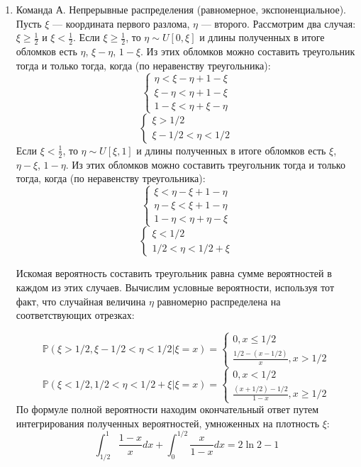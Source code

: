 \documentclass[a4paper,12pt]{article}
\def \P{\mathbb{P}}
\begin{document}
\begin{enumerate}
\item Команда А. Непрерывные распределения (равномерное, экспоненциальное).
Пусть $\xi$ — координата первого разлома, $\eta$ — второго. Рассмотрим два случая: $\xi\geq\frac{1}{2}$ и $\xi<\frac{1}{2}$.
Если $\xi\geq\frac{1}{2}$, то $\eta \sim U[0,\xi]$ и длины полученных в итоге обломков есть $\eta$, $\xi-\eta$, $1-\xi$. Из этих обломков можно составить треугольник тогда и только тогда, когда (по неравенству треугольника):
\[\begin{cases} \eta < \xi-\eta+1-\xi\\
\xi-\eta<\eta+1-\xi\\
1-\xi<\eta+\xi-\eta
\end{cases}
\]
\[\begin{cases} \xi>1/2\\
\xi-1/2<\eta<1/2
\end{cases}
\]
Если $\xi<\frac{1}{2}$, то $\eta \sim U[\xi,1]$ и длины полученных в итоге обломков есть $\xi$, $\eta-\xi$, $1-\eta$. Из этих обломков можно составить треугольник тогда и только тогда, когда (по неравенству треугольника):
\[\begin{cases} \xi < \eta-\xi+1-\eta\\
\eta-\xi<\xi+1-\eta\\
1-\eta<\eta+\eta-\xi
\end{cases}
\]
\[\begin{cases} \xi<1/2\\
1/2<\eta<1/2+\xi
\end{cases}
\]

Искомая вероятность составить треугольник равна сумме вероятностей в каждом из этих случаев. Вычислим условные вероятности, используя тот факт, что случайная величина $\eta$ равномерно распределена на соответствующих отрезках:

\[\P(\xi>1/2,\xi-1/2<\eta<1/2 | \xi=x)=\begin{cases}0,x\leq1/2\\
\frac{1/2-(x-1/2)}{x}, x>1/2
\end{cases}
\]
\[\P(\xi<1/2,1/2<\eta<1/2+\xi|\xi=x)=\begin{cases}0,x<1/2\\
\frac{(x+1/2)-1/2}{1-x}, x\geq1/2
\end{cases}
\]
По формуле полной вероятности находим окончательный ответ путем интегрирования полученных вероятностей, умноженных на плотность $\xi$:
\[\int^1_{1/2}\frac{1-x}{x}dx+\int^{1/2}_0\frac{x}{1-x}dx=2\ln2-1\]
\end{enumerate}
\end{document}
